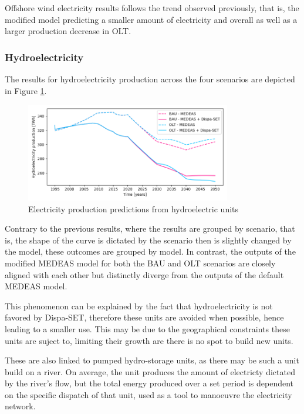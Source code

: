 Offshore wind electricity results follows the trend observed previously, that is, the modified model predicting a smaller amount of electricity and overall as well as a larger production decrease in OLT.

\subsubsection{Hydroelectricity}

The results for hydroelectricity production across the four scenarios are depicted in Figure \ref{fig:electricity-production-hydro}.

\begin{figure}[h]
    \centering
    \includegraphics[width=0.8\textwidth]{resources/images/electricity-production-hydro.png}
    \caption{Electricity production predictions from hydroelectric units}
    \label{fig:electricity-production-hydro}
\end{figure}

Contrary to the previous results, where the results are grouped by scenario, that is, the shape of the curve is dictated by the scenario then is slightly changed by the model, these outcomes are grouped by model. In contrast, the outputs of the modified MEDEAS model for both the BAU and OLT scenarios are closely aligned with each other but distinctly diverge from the outputs of the default MEDEAS model.

This phenomenon can be explained by the fact that hydroelectricity is not favored by Dispa-SET, therefore these units are avoided when possible, hence leading to a smaller use. This may be due to the geographical constraints these units are suject to, limiting their growth are there is no spot to build new units.

These are also linked to pumped hydro-storage units, as there may be such a unit build on a river. On average, the unit produces the amount of electricty dictated by the river's flow, but the total energy produced over a set period is dependent on the specific dispatch of that unit, used as a tool to manoeuvre the electricity network.

